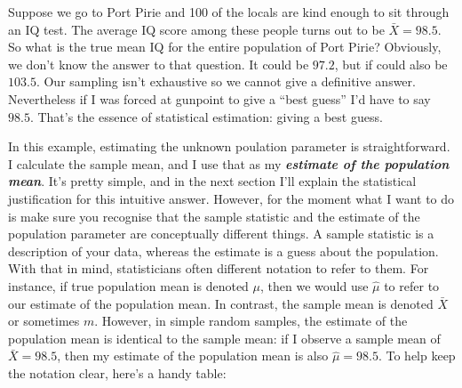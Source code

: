 \documentclass[spanish,]{book}
\newenvironment{Shaded}{\begin{snugshade}}{\end{snugshade}}
\newcommand{\KeywordTok}[1]{\textcolor[rgb]{0.13,0.29,0.53}{\textbf{#1}}}
\newcommand{\DataTypeTok}[1]{\textcolor[rgb]{0.13,0.29,0.53}{#1}}
\newcommand{\CharTok}[1]{\textcolor[rgb]{0.31,0.60,0.02}{#1}}
\newcommand{\StringTok}[1]{\textcolor[rgb]{0.31,0.60,0.02}{#1}}
\newcommand{\OtherTok}[1]{\textcolor[rgb]{0.56,0.35,0.01}{#1}}
\newcommand{\OperatorTok}[1]{\textcolor[rgb]{0.81,0.36,0.00}{\textbf{#1}}}
\newcommand{\NormalTok}[1]{#1}
\begin{document}
Suppose we go to Port Pirie and 100 of the locals are kind enough to sit
through an IQ test. The average IQ score among these people turns out to
be \(\bar{X}=98.5\). So what is the true mean IQ for the entire
population of Port Pirie? Obviously, we don't know the answer to that
question. It could be \(97.2\), but if could also be \(103.5\). Our
sampling isn't exhaustive so we cannot give a definitive answer.
Nevertheless if I was forced at gunpoint to give a ``best guess'' I'd
have to say \(98.5\). That's the essence of statistical estimation:
giving a best guess.

In this example, estimating the unknown poulation parameter is
straightforward. I calculate the sample mean, and I use that as my
\textbf{\emph{estimate of the population mean}}. It's pretty simple, and
in the next section I'll explain the statistical justification for this
intuitive answer. However, for the moment what I want to do is make sure
you recognise that the sample statistic and the estimate of the
population parameter are conceptually different things. A sample
statistic is a description of your data, whereas the estimate is a guess
about the population. With that in mind, statisticians often different
notation to refer to them. For instance, if true population mean is
denoted \(\mu\), then we would use \(\hat\mu\) to refer to our estimate
of the population mean. In contrast, the sample mean is denoted
\(\bar{X}\) or sometimes \(m\). However, in simple random samples, the
estimate of the population mean is identical to the sample mean: if I
observe a sample mean of \(\bar{X} = 98.5\), then my estimate of the
population mean is also \(\hat\mu = 98.5\). To help keep the notation
clear, here's a handy table:

\begin{Shaded}
\end{Shaded}
\end{document}
